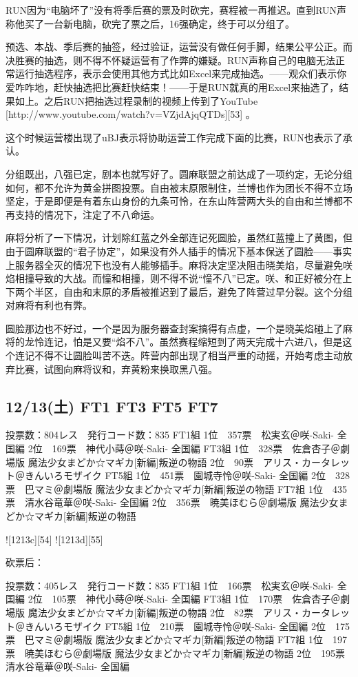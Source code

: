 RUN因为“电脑坏了”没有将季后赛的票及时砍完，赛程被一再推迟。直到RUN声称他买了一台新电脑，砍完了票之后，16强确定，终于可以分组了。

预选、本战、季后赛的抽签，经过验证，运营没有做任何手脚，结果公平公正。而决胜赛的抽选，则不得不怀疑运营有了作弊的嫌疑。RUN声称自己的电脑无法正常运行抽选程序，表示会使用其他方式比如Excel来完成抽选。——观众们表示你爱咋咋地，赶快抽选把比赛赶快结束！——于是RUN就真的用Excel来抽选了，结果如上。之后RUN把抽选过程录制的视频上传到了YouTube [http://www.youtube.com/watch?v=VZjdAjqQTDs][53] 。

这个时候运营楼出现了uBJ表示将协助运营工作完成下面的比赛，RUN也表示了承认。

分组既出，八强已定，剧本也就写好了。圆麻联盟之前达成了一项约定，无论分组如何，都不允许为黄金拼图投票。自由被末原限制住，兰博也作为团长不得不立场坚定，于是即便是有着东山身份的九条可怜，在东山阵营两大头的自由和兰博都不再支持的情况下，注定了不八命运。

麻将分析了一下情况，计划除红蓝之外全部连记死圆脸，虽然红蓝撞上了黄图，但由于圆麻联盟的“君子协定”，如果没有外人插手的情况下基本保送了圆脸——事实上服务器全灭的情况下也没有人能够插手。麻将决定坚决阻击晓美焰，尽量避免咲焰相撞导致的大战。而憧和相撞，则不得不说“憧不八”已定。咲、和正好被分在上下两个半区，自由和末原的矛盾被推迟到了最后，避免了阵营过早分裂。这个分组对麻将有利也有弊。

圆脸那边也不好过，一个是因为服务器查封案搞得有点虚，一个是晓美焰碰上了麻将的龙怜连记，怕是又要“焰不八”。虽然赛程缩短到了两天完成十六进八，但是这个连记不得不让圆脸叫苦不迭。阵营内部出现了相当严重的动摇，开始考虑主动放弃比赛，试图向麻将议和，弃黄粉来换取黑八强。

\subsection{12/13(土) FT1 FT3 FT5 FT7}

	投票数：804レス　発行コード数：835
	FT1組
	1位　357票　松実玄＠咲-Saki- 全国編
	2位　169票　神代小蒔＠咲-Saki- 全国編
	FT3組
	1位　328票　佐倉杏子＠劇場版 魔法少女まどか☆マギカ[新編]叛逆の物語
	2位　90票　アリス・カータレット＠きんいろモザイク
	FT5組
	1位　451票　園城寺怜＠咲-Saki- 全国編
	2位　328票　巴マミ＠劇場版 魔法少女まどか☆マギカ[新編]叛逆の物語
	FT7組
	1位　435票　清水谷竜華＠咲-Saki- 全国編
	2位　356票　暁美ほむら＠劇場版 魔法少女まどか☆マギカ[新編]叛逆の物語

![1213c][54]
![1213d][55]

砍票后：

	投票数：405レス　発行コード数：835
	FT1組
	1位　166票　松実玄＠咲-Saki- 全国編
	2位　105票　神代小蒔＠咲-Saki- 全国編
	FT3組
	1位　170票　佐倉杏子＠劇場版 魔法少女まどか☆マギカ[新編]叛逆の物語
	2位　82票　アリス・カータレット＠きんいろモザイク
	FT5組
	1位　210票　園城寺怜＠咲-Saki- 全国編
	2位　175票　巴マミ＠劇場版 魔法少女まどか☆マギカ[新編]叛逆の物語
	FT7組
	1位　197票　暁美ほむら＠劇場版 魔法少女まどか☆マギカ[新編]叛逆の物語
	2位　195票　清水谷竜華＠咲-Saki- 全国編

